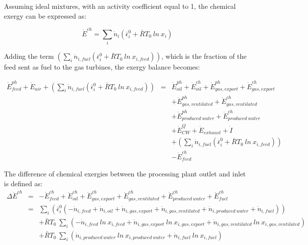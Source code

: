 \documentclass[preprint,times,review,3p]{elsarticle}
\begin{document}
Assuming ideal mixtures, with an activity coefficient equal to 1, the chemical exergy can be expressed as:

	\begin{equation}
	\dot{E}^{ch}=\sum_i \dot{n}_{i}\left(\bar{\epsilon}^0_i+\bar{R}T_0\ ln\ x_{i}\right)
	\end{equation}

Adding the term $\left(\sum_i \dot{n}_{i,fuel}\left(\bar{\epsilon}^0_i+\bar{R}T_0\ ln\ x_{i,feed}\right)\right)$, which is the fraction of the feed sent as fuel to the gas turbines, the exergy balance becomes:

		\begin{eqnarray}
			\dot{E}_{feed}^{ph}+\dot{E}_{air}+\left(\sum_i \dot{n}_{i,fuel}\left(\bar{\epsilon}^0_i+\bar{R}T_0\ ln\ x_{i,feed}\right)\right) &=& 		\dot{E}_{oil}^{ph}+\dot{E}_{oil}^{ch}+\dot{E}_{gas,export}^{ph}+\dot{E}_{gas,export}^{ch}\nonumber\\
																							&&+\dot{E}_{gas,ventilated}^{ph}+\dot{E}_{gas,ventilated}^{ch}\nonumber\\&&+\dot{E}_{produced\ water}^{ph}+\dot{E}_{produced\ water}^{ch}\nonumber\\
																							&&+\dot{E}^Q_{CW}+\dot{E}_{exhaust}+\dot{I} \nonumber\\
																							&&+\left(\sum_i \dot{n}_{i,fuel}\left(\bar{\epsilon}^0_i+\bar{R}T_0\ ln\ x_{i,feed}\right)\right)\nonumber\\
																							&&-\dot{E}_{feed}^{ch}
			\end{eqnarray}
			
			The difference of chemical exergies between the processing plant outlet and inlet is defined as:
			 \begin{eqnarray}
			\Delta \dot{E}^{ch} &=& -\dot{E}_{feed}^{ch}+\dot{E}_{oil}^{ch}+\dot{E}_{gas,export}^{ch}+\dot{E}_{gas,ventilated}^{ch}+\dot{E}_{produced\ water}^{ch}+\dot{E}_{fuel}^{ch} \\
										 &=& \sum_i \left(\bar{\epsilon}^0_i\left(-\dot{n}_{i,feed}+\dot{n}_{i,oil}+\dot{n}_{i,gas,export}+\dot{n}_{i,gas,ventilated}+ \dot{n}_{i,produced\ water}+\dot{n}_{i,fuel}\right)\right)\nonumber\\
										 && +\bar{R}T_0\ \sum_i\left(-\dot{n}_{i,feed}\ ln\ x_{i,feed}+\dot{n}_{i,gas,export}\ ln\ x_{i,gas,export}+\dot{n}_{i,gas,ventilated}\ ln\ x_{i,gas,ventilated}\right)\nonumber\\
										 && +\bar{R}T_0\ \sum_i\left(\dot{n}_{i,produced\ water}\ ln\ x_{i,produced\ water}+\dot{n}_{i,fuel}\ ln\ x_{i,fuel}\right)
			\end{eqnarray}
			
\end{document}

